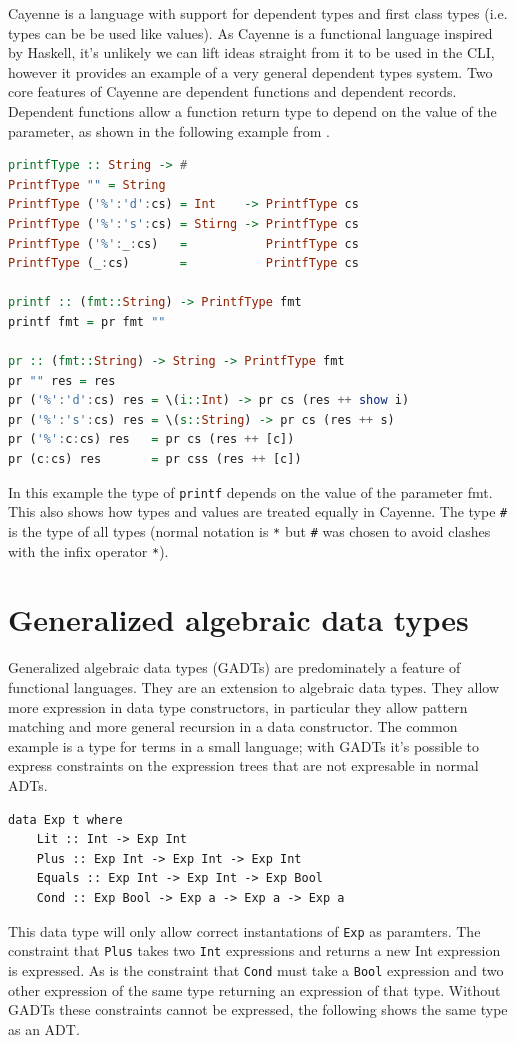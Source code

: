 \documentclass[english]{report}
\begin{document}
Cayenne\cite{cayenne} is a language with support for dependent types
and first class types (i.e. types can be be used like values). As
Cayenne is a functional language inspired by Haskell, it's unlikely
we can lift ideas straight from it to be used in the CLI, however
it provides an example of a very general dependent types system. Two
core features of Cayenne are dependent functions and dependent records.
Dependent functions allow a function return type to depend on the
value of the parameter, as shown in the following example from \cite{cayenne}.

\begin{lstlisting}[keywordstyle={\color{blue}},language=Haskell]
printfType :: String -> #
PrintfType "" = String
PrintfType ('%':'d':cs) = Int    -> PrintfType cs
PrintfType ('%':'s':cs) = Stirng -> PrintfType cs
PrintfType ('%':_:cs)   =           PrintfType cs
PrintfType (_:cs)       =           PrintfType cs

printf :: (fmt::String) -> PrintfType fmt
printf fmt = pr fmt ""

pr :: (fmt::String) -> String -> PrintfType fmt
pr "" res = res
pr ('%':'d':cs) res = \(i::Int) -> pr cs (res ++ show i)
pr ('%':'s':cs) res = \(s::String) -> pr cs (res ++ s)
pr ('%':c:cs) res   = pr cs (res ++ [c])
pr (c:cs) res       = pr css (res ++ [c])
\end{lstlisting}


In this example the type of \texttt{printf} depends on the value of
the parameter fmt. This also shows how types and values are treated
equally in Cayenne. The type \texttt{\#} is the type of all types
(normal notation is \texttt{{*}} but \texttt{\#} was chosen to avoid
clashes with the infix operator \texttt{{*}}). 


\section{Generalized algebraic data types\label{sec:GADTs}}

Generalized algebraic data types (GADTs) are predominately a feature
of functional languages. They are an extension to algebraic data types.
They allow more expression in data type constructors, in particular
they allow pattern matching and more general recursion in a data constructor.
The common example is a type for terms in a small language; with GADTs
it's possible to express constraints on the expression trees that
are not expresable in normal ADTs.

\begin{lstlisting}[caption={GADT},keywordstyle={\color{blue}}]
data Exp t where
	Lit :: Int -> Exp Int
	Plus :: Exp Int -> Exp Int -> Exp Int
	Equals :: Exp Int -> Exp Int -> Exp Bool
	Cond :: Exp Bool -> Exp a -> Exp a -> Exp a
\end{lstlisting}
This data type will only allow correct instantations of \texttt{Exp}
as paramters. The constraint that \texttt{Plus} takes two \texttt{Int}
expressions and returns a new Int expression is expressed. As is the
constraint that \texttt{Cond} must take a \texttt{Bool} expression
and two other expression of the same type returning an expression
of that type. Without GADTs these constraints cannot be expressed,
the following shows the same type as an ADT.
\end{document}
